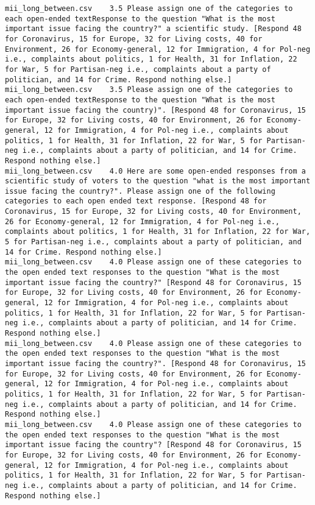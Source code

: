 \begin{lstlisting}[label=lst:promptvariants]
mii_long_between.csv	3.5	Please assign one of the categories to each open-ended textResponse to the question "What is the most important issue facing the country?" a scientific study. [Respond 48 for Coronavirus, 15 for Europe, 32 for Living costs, 40 for Environment, 26 for Economy-general, 12 for Immigration, 4 for Pol-neg i.e., complaints about politics, 1 for Health, 31 for Inflation, 22 for War, 5 for Partisan-neg i.e., complaints about a party of politician, and 14 for Crime. Respond nothing else.]
mii_long_between.csv	3.5	Please assign one of the categories to each open-ended textResponse to the question "What is the most important issue facing the country)". [Respond 48 for Coronavirus, 15 for Europe, 32 for Living costs, 40 for Environment, 26 for Economy-general, 12 for Immigration, 4 for Pol-neg i.e., complaints about politics, 1 for Health, 31 for Inflation, 22 for War, 5 for Partisan-neg i.e., complaints about a party of politician, and 14 for Crime. Respond nothing else.]
mii_long_between.csv	4.0	Here are some open-ended responses from a scientific study of voters to the question "what is the most important issue facing the country?". Please assign one of the following categories to each open ended text response. [Respond 48 for Coronavirus, 15 for Europe, 32 for Living costs, 40 for Environment, 26 for Economy-general, 12 for Immigration, 4 for Pol-neg i.e., complaints about politics, 1 for Health, 31 for Inflation, 22 for War, 5 for Partisan-neg i.e., complaints about a party of politician, and 14 for Crime. Respond nothing else.]
mii_long_between.csv	4.0	Please assign one of these categories to the open ended text responses to the question "What is the most important issue facing the country?" [Respond 48 for Coronavirus, 15 for Europe, 32 for Living costs, 40 for Environment, 26 for Economy-general, 12 for Immigration, 4 for Pol-neg i.e., complaints about politics, 1 for Health, 31 for Inflation, 22 for War, 5 for Partisan-neg i.e., complaints about a party of politician, and 14 for Crime. Respond nothing else.]
mii_long_between.csv	4.0	Please assign one of these categories to the open ended text responses to the question "What is the most important issue facing the country?". [Respond 48 for Coronavirus, 15 for Europe, 32 for Living costs, 40 for Environment, 26 for Economy-general, 12 for Immigration, 4 for Pol-neg i.e., complaints about politics, 1 for Health, 31 for Inflation, 22 for War, 5 for Partisan-neg i.e., complaints about a party of politician, and 14 for Crime. Respond nothing else.]
mii_long_between.csv	4.0	Please assign one of these categories to the open ended text responses to the question "What is the most important issue facing the country"? [Respond 48 for Coronavirus, 15 for Europe, 32 for Living costs, 40 for Environment, 26 for Economy-general, 12 for Immigration, 4 for Pol-neg i.e., complaints about politics, 1 for Health, 31 for Inflation, 22 for War, 5 for Partisan-neg i.e., complaints about a party of politician, and 14 for Crime. Respond nothing else.]

\end{lstlisting}
